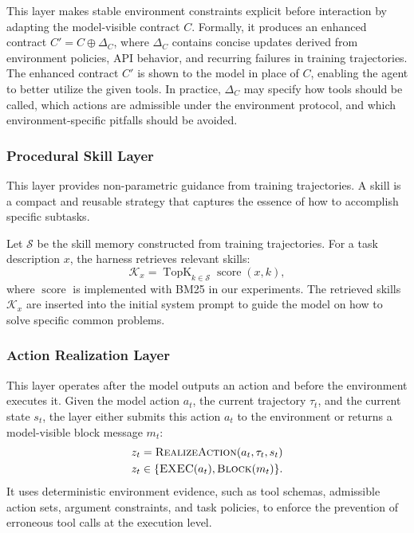 This layer makes stable environment constraints explicit before interaction by adapting the model-visible contract \(C\). Formally, it produces an enhanced contract $C' = C \oplus \Delta_C$, where \(\Delta_C\) contains concise updates derived from environment policies,
API behavior, and recurring failures in training trajectories. The enhanced contract \(C'\) is shown to the model in place of \(C\), enabling the agent to better utilize the given tools.
In practice, \(\Delta_C\) may specify how tools should be called, which actions are admissible under the environment protocol, and which environment-specific pitfalls should be avoided.

\subsubsection{Procedural Skill Layer}
\label{sec:h5}

This layer provides non-parametric guidance from training
trajectories. A skill is a compact and reusable strategy that captures the essence of how to accomplish specific subtasks.

Let \(\mathcal{S}\) be the skill memory constructed from training trajectories.
For a task description \(x\), the harness retrieves relevant skills:
\[
    \mathcal{K}_x =
    \operatorname{TopK}_{k \in \mathcal{S}}
    \operatorname{score}(x,k),
\]
where \(\operatorname{score}\) is implemented with BM25 in our experiments. The
retrieved skills \(\mathcal{K}_x\) are inserted into the initial system prompt to guide the model on how to solve specific common problems.

\subsubsection{Action Realization Layer}
\label{sec:h2}

This layer operates after the model outputs an action and
before the environment executes it. Given the model action \(a_t\), the current
trajectory \(\tau_t\), and the current state \(s_t\), the
layer either submits this action \( a_t\) to the environment or
returns a model-visible block message \(m_t\):
\begin{align*}
    &z_t =
    \textsc{RealizeAction}(a_t, \tau_t, s_t)\\
    &z_t \in \{\textsc{EXEC}(a_t), \textsc{Block}(m_t)\}.
\end{align*}
It uses deterministic environment evidence, such as tool schemas, admissible action sets, argument constraints, and task policies, to enforce the prevention of erroneous tool calls at the execution level.

